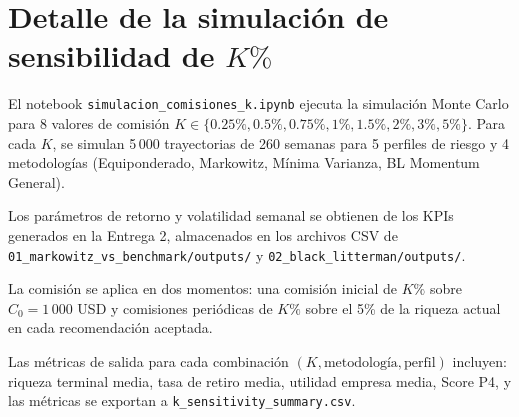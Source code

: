 \section{Detalle de la simulaci\'on de sensibilidad de $K\%$}

El notebook \texttt{simulacion\_comisiones\_k.ipynb} ejecuta la simulaci\'on
Monte Carlo para 8 valores de comisi\'on $K \in \{0.25\%, 0.5\%, 0.75\%,
1\%, 1.5\%, 2\%, 3\%, 5\%\}$. Para cada $K$, se simulan 5\,000 trayectorias
de 260 semanas para 5 perfiles de riesgo y 4 metodolog\'ias
(Equiponderado, Markowitz, M\'inima Varianza, BL Momentum General).

Los par\'ametros de retorno y volatilidad semanal se obtienen de los KPIs
generados en la Entrega 2, almacenados en los archivos CSV de
\texttt{01\_markowitz\_vs\_benchmark/outputs/} y
\texttt{02\_black\_litterman/outputs/}.

La comisi\'on se aplica en dos momentos: una comisi\'on inicial de $K\%$ sobre
$C_0 = 1\,000$ USD y comisiones peri\'odicas de $K\%$ sobre el 5\% de la
riqueza actual en cada recomendaci\'on aceptada.

Las m\'etricas de salida para cada combinaci\'on $(K, \text{metodolog\'ia},
\text{perfil})$ incluyen: riqueza terminal media, tasa de retiro media,
utilidad empresa media, Score P4, y las m\'etricas se exportan a
\texttt{k\_sensitivity\_summary.csv}.
